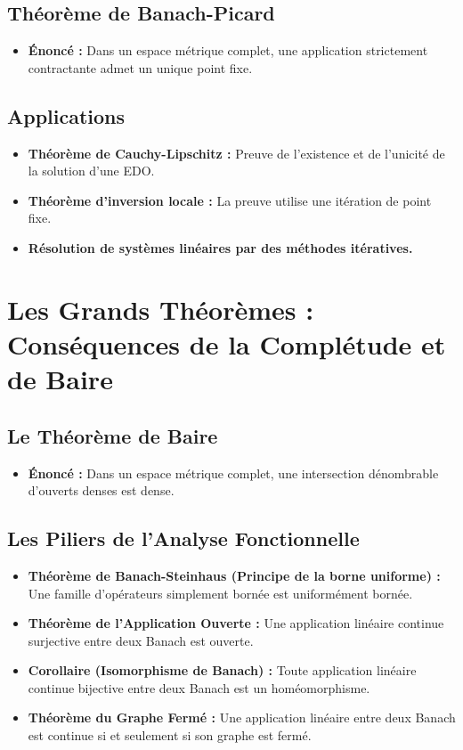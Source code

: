\documentclass[12pt, a4paper, parskip=full]{report}
\theoremstyle{agregstyle}
\begin{document}
\subsection{Théorème de Banach-Picard}
\begin{itemize}
    \item \textbf{Énoncé :} Dans un espace métrique complet, une application strictement contractante admet un unique point fixe.
\end{itemize}
\subsection{Applications}
\begin{itemize}
    \item \textbf{Théorème de Cauchy-Lipschitz :} Preuve de l'existence et de l'unicité de la solution d'une EDO.
    \item \textbf{Théorème d'inversion locale :} La preuve utilise une itération de point fixe.
    \item \textbf{Résolution de systèmes linéaires par des méthodes itératives.}
\end{itemize}

\section{Les Grands Théorèmes : Conséquences de la Complétude et de Baire}
\subsection{Le Théorème de Baire}
\begin{itemize}
    \item \textbf{Énoncé :} Dans un espace métrique complet, une intersection dénombrable d'ouverts denses est dense.
\end{itemize}
\subsection{Les Piliers de l'Analyse Fonctionnelle}
\begin{itemize}
    \item \textbf{Théorème de Banach-Steinhaus (Principe de la borne uniforme) :} Une famille d'opérateurs simplement bornée est uniformément bornée.
    \item \textbf{Théorème de l'Application Ouverte :} Une application linéaire continue surjective entre deux Banach est ouverte.
    \item \textbf{Corollaire (Isomorphisme de Banach) :} Toute application linéaire continue bijective entre deux Banach est un homéomorphisme.
    \item \textbf{Théorème du Graphe Fermé :} Une application linéaire entre deux Banach est continue si et seulement si son graphe est fermé.
\end{itemize}
\end{document}
